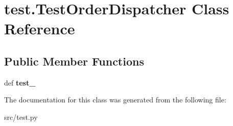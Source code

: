 \hypertarget{classtest_1_1_test_order_dispatcher}{\section{test.\-Test\-Order\-Dispatcher \-Class \-Reference}
\label{classtest_1_1_test_order_dispatcher}
}
\subsection*{\-Public \-Member \-Functions}
\begin{DoxyCompactItemize}
\item 
\hypertarget{classtest_1_1_test_order_dispatcher_a2ea286ce39d6d156cae967e70ae79c38}{def {\bfseries test\-\_\-}}\label{classtest_1_1_test_order_dispatcher_a2ea286ce39d6d156cae967e70ae79c38}

\end{DoxyCompactItemize}


\-The documentation for this class was generated from the following file\-:\begin{DoxyCompactItemize}
\item 
src/test.\-py\end{DoxyCompactItemize}
